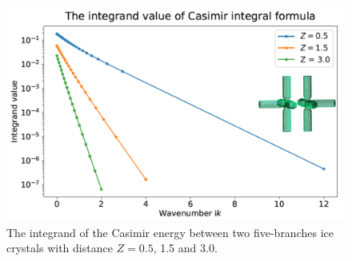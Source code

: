         \begin{figure}[H]
            \centering
            \includegraphics[scale = 1]{figures/5branches_integrand_Value.png}
            \caption{The integrand of the Casimir energy between two five-branches ice crystals with distance $Z = 0.5$, 1.5 and 3.0.}      
              \end{figure}
        
